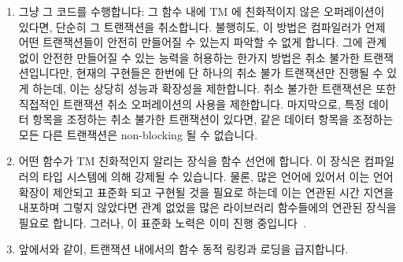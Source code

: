 \begin{enumerate}
\item	그냥 그 코드를 수행합니다: 그 함수 내에 TM 에 친화적이지 않은
	오퍼레이션이 있다면, 단순히 그 트랜잭션을 취소합니다.
	불행히도, 이 방법은 컴파일러가 언제 어떤 트랜잭션들이 안전히 만들어질
	수 있는지 파악할 수 없게 합니다.
	그에 관계 없이 안전한 만들어질 수 있는 능력을 허용하는 한가지 방법은
	취소 불가한 트랜잭션입니다만, 현재의 구현들은 한번에 단 하나의 취소
	불가 트랜잭션만 진행될 수 있게 하는데, 이는 상당히 성능과 확장성을
	제한합니다.
	취소 불가한 트랜잭션은 또한 직접적인 트랜잭션 취소 오퍼레이션의 사용을
	제한합니다.
	마지막으로, 특정 데이터 항목을 조정하는 취소 불가한 트랜잭션이 있다면,
	같은 데이터 항목을 조정하는 모든 다른 트랜잭션은 non-blocking 될 수
	없습니다.
\item	어떤 함수가 TM 친화적인지 알리는 장식을 함수 선언에 합니다.
	이 장식은 컴파일러의 타입 시스템에 의해 강제될 수 있습니다.
	물론, 많은 언어에 있어서 이는 언어 확장이 제안되고 표준화 되고 구현될
	것을 필요로 하는데 이는 연관된 시간 지연을 내포하며 그렇지 않았다면
	관계 없었을 많은 라이브러리 함수들에의 연관된 장식을 필요로 합니다.
	그러나, 이 표준화 노력은 이미 진행
	중입니다~\cite{ALi-Reza-Adl-Tabatabai2009CppTM}.
\item	앞에서와 같이, 트랜잭션 내에서의 함수 동적 링킹과 로딩을 급지합니다.

\end{enumerate}

